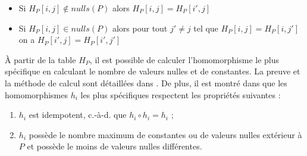 \begin{itemize}
	\item Si $H_P[i, j] \notin nulls(P)$ alors $H_P[i, j] = H_P[i', j]$
	\item Si $H_P[i, j] \in nulls(P)$ alors pour tout $j' \neq j$ tel que $H_P[i, j] = H_P[i, j']$ on a $H_P[i', j] = H_P[i', j']$
\end{itemize}

À partir de la table $H_P$, il est possible de calculer l'homomorphisme le plus spécifique en calculant le nombre de valeurs nulles et de constantes.
La preuve et la méthode de calcul sont détaillées dans \cite{chabinIncrementalConsistentUpdating2023}.
De plus, il est montré dans \cite{chabinIncrementalConsistentUpdating2023} que les homomorphismes $h_i$ les plus spécifiques respectent les propriétés suivantes :

\begin{enumerate}
	\item $h_i$ est idempotent, c.-à-d. que $h_i \circ h_i = h_i$ ;
	\item $h_i$ possède le nombre maximum de constantes ou de valeurs nulles extérieur à $P$ et possède le moins de valeurs nulles différentes.
\end{enumerate}

